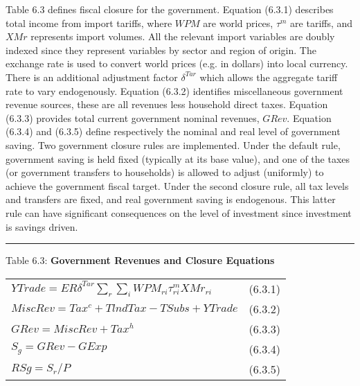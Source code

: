 \documentclass{article}
\begin{document}
Table 6.3 defines fiscal closure for the government. Equation (6.3.1) describes total income from import tariffs, where $WPM$ are world prices, $\tau^m$ are tariffs, and $XMr$ represents import volumes. All the relevant import variables are doubly indexed since they represent variables by sector and region of origin. The exchange rate is used to convert world prices (e.g. in dollars) into local currency. There is an additional adjustment factor $\delta^{Tar}$ which allows the aggregate tariff rate to vary endogenously. Equation (6.3.2) identifies miscellaneous government revenue sources, these are all revenues less household direct taxes. Equation (6.3.3) provides total current government nominal revenues, $GRev$. Equation (6.3.4) and (6.3.5) define respectively the nominal and real level of government saving. Two government closure rules are implemented. Under the default rule, government saving is held fixed (typically at its base value), and one of the taxes (or government transfers to households) is allowed to adjust (uniformly) to achieve the government fiscal target. Under the second closure rule, all tax levels and transfers are fixed, and real government saving is endogenous. This latter rule can have significant consequences on the level of investment since investment is savings driven.

\noindent\rule{\linewidth}{0.4pt}
\begin{center}
\begin{large}
{\centering Table 6.3: \textbf{Government Revenues and Closure Equations} \par}

\begin{tabular}{>{\raggedright}p{} l}

$YTrade = ER\delta^{Tar} \displaystyle \sum_r \sum_i WPM_{ri}\tau^m_{ri}XMr_{ri}$ & (6.3.1)\\[15pt]

$MiscRev = Tax^c + TlndTax - TSubs + YTrade$ & (6.3.2)\\[15pt]

$GRev = MiscRev + Tax^h$ & (6.3.3)\\[15pt]

$S_g = GRev - GExp$ & (6.3.4)\\[15pt]

$RSg = S_r / P$ & (6.3.5)\\[20pt]

\hline
\end{tabular}
\end{large}
\end{center}
\end{document}

